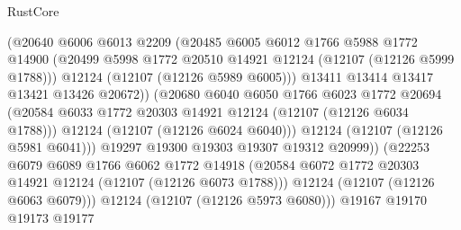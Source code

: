 \begin{lexlean}{RustCore}
\begin{coremodule}
                              (@20640
                                @6006
                                @6013
                                @2209
                                (@20485
                                  @6005
                                  @6012
                                  @1766
                                  @5988
                                  @1772
                                  @14900
                                  (@20499
                                    @5998
                                    @1772
                                    @20510
                                    @14921
                                    @12124
                                    (@12107 (@12126 @5999 @1788)))
                                  @12124
                                  (@12107 (@12126 @5989 @6005)))
                                @13411
                                @13414
                                @13417
                                @13421
                                @13426
                                @20672))
                            (@20680
                              @6040
                              @6050
                              @1766
                              @6023
                              @1772
                              @20694
                              (@20584
                                @6033
                                @1772
                                @20303
                                @14921
                                @12124
                                (@12107 (@12126 @6034 @1788)))
                              @12124
                              (@12107 (@12126 @6024 @6040)))
                            @12124
                            (@12107 (@12126 @5981 @6041)))
                          @19297
                          @19300
                          @19303
                          @19307
                          @19312
                          @20999))
                      (@22253
                        @6079
                        @6089
                        @1766
                        @6062
                        @1772
                        @14918
                        (@20584 @6072 @1772 @20303 @14921 @12124 (@12107 (@12126 @6073 @1788)))
                        @12124
                        (@12107 (@12126 @6063 @6079)))
                      @12124
                      (@12107 (@12126 @5973 @6080)))
                    @19167
                    @19170
                    @19173
                    @19177

\end{coremodule}
\end{lexlean}

